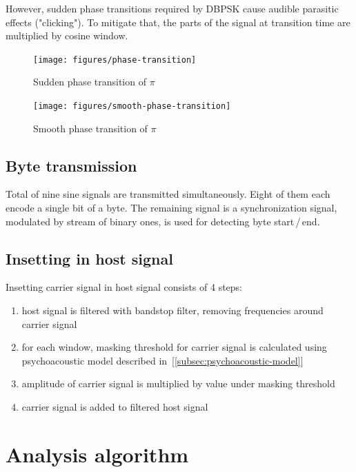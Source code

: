 \documentclass[english,bachelor,a4paper,oneside]{ppfcmthesis}
\begin{document}
However, sudden phase transitions required by DBPSK cause audible parasitic effects ("clicking"). To mitigate that, the parts of the signal at transition time are multiplied by cosine window.

\begin{figure}[h]
  \texttt{[image: figures/phase-transition]}
  \caption{Sudden phase transition of $\pi$}
  \label{fig:phase-transition}
\end{figure}

\begin{figure}[h]
  \texttt{[image: figures/smooth-phase-transition]}
  \caption{Smooth phase transition of $\pi$}
  \label{fig:smooth-phase-transition}
\end{figure}

\subsection{Byte transmission}

Total of nine sine signals are transmitted simultaneously. Eight of them each encode a single bit of a byte. The remaining signal is a synchronization signal, modulated by stream of binary ones, is used for detecting byte start\,/\,end.


\subsection{Insetting in host signal}

Insetting carrier signal in host signal consists of 4 steps:

\begin{enumerate}
\item host signal is filtered with bandstop filter, removing frequencies around carrier signal
\item for each window, masking threshold for carrier signal is calculated using psychoacoustic model described in~[\ref{subsec:psychoacoustic-model}]
\item amplitude of carrier signal is multiplied by value under masking threshold
\item carrier signal is added to filtered host signal
\end{enumerate}

\section{Analysis algorithm}
\end{document}
